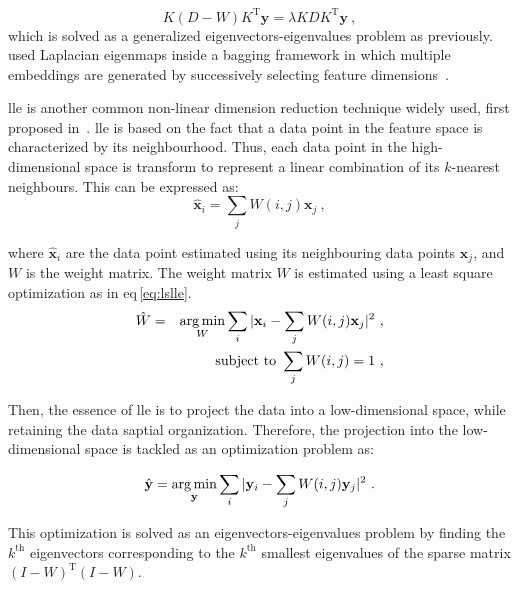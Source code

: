 \begin{equation}
  K (D-W) K^{\text{T}} \mathbf{y} = \lambda K D K^{\text{T}} \mathbf{y} \ ,
  \label{eq:sesmik}
\end{equation}
\noindent which is solved as a generalized eigenvectors-eigenvalues problem as previously.
\citeauthor{Viswanath2011} used Laplacian eigenmaps inside a bagging framework in which multiple embeddings are generated by successively selecting feature dimensions~\cite{Viswanath2011}.

\Ac{lle} is another common non-linear dimension reduction technique widely used, first proposed in~\cite{Roweis2000}.
\ac{lle} is based on the fact that a data point in the feature space is characterized by its neighbourhood.
Thus, each data point in the high-dimensional space is transform to represent a linear combination of its $k$-nearest neighbours.
This can be expressed as:
\begin{equation}
	\hat{\mathbf{x}}_i = \sum_j W(i,j) \mathbf{x}_j \ ,
	\label{eq:lincomlle}
\end{equation}

\noindent where $\hat{\mathbf{x}}_i$ are the data point estimated using its neighbouring data points $\mathbf{x}_j$, and $W$ is the weight matrix.
The weight matrix $W$ is estimated using a least square optimization as in \acs{eq}\,\eqref{eq:lslle}.
\begin{eqnarray}
	\hat{W} & = & \operatorname*{arg\,min}_{W} \sum_i | \mathbf{x}_i - \sum_j W(i,j)\mathbf{x}_j |^{2} \ , \label{eq:lslle} \\
	&& \text{subject to } \sum_j W(i,j) = 1 \ , \nonumber
\end{eqnarray}

Then, the essence of \ac{lle} is to project the data into a low-dimensional space, while retaining the data saptial organization.
Therefore, the projection into the low-dimensional space is tackled as an optimization problem as:

\begin{equation}
	\hat{\mathbf{y}} = \operatorname*{arg\,min}_{\mathbf{y}} \sum_i | \mathbf{y}_i - \sum_j W(i,j)\mathbf{y}_j |^{2} \ .
	\label{eq:lowprojlle}
\end{equation}

This optimization is solved as an eigenvectors-eigenvalues problem by finding the $k^{\text{th}}$ eigenvectors corresponding to the $k^{\text{th}}$ smallest eigenvalues of the sparse matrix $(I-W)^{\text{T}}(I-W)$.

